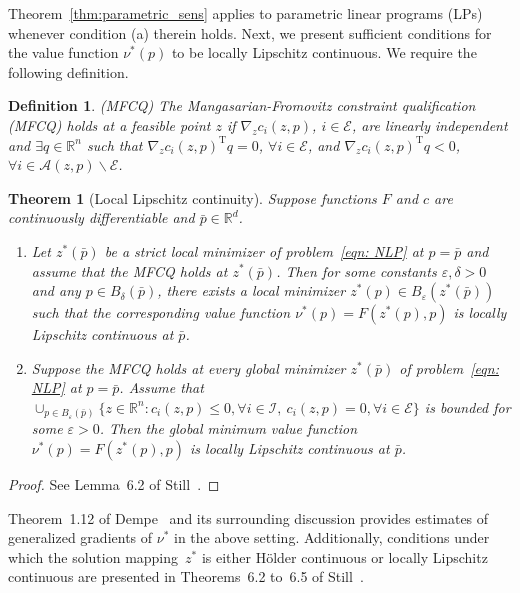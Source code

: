 \documentclass{article}
\newcommand{\tr}[1]{\ensuremath{{#1}^\text{T}}}
\newcommand{\A}{\mathcal{A}}
\newcommand{\E}{\mathcal{E}}
\newcommand{\I}{\mathcal{I}}
\newcommand{\R}{\mathbb{R}}
\newcommand{\1}[1]{\mathds{1}\left[#1\right]}
\newtheorem{theorem}{Theorem}[]
\newtheorem{definition}{Definition}
\begin{document}
Theorem~\ref{thm:parametric_sens} applies to parametric linear programs (LPs) whenever condition (a) therein holds.
Next, we present sufficient conditions for the value function $\nu^*(p)$ to be locally Lipschitz continuous.
We require the following definition.



\begin{definition}{(MFCQ)}
The Mangasarian-Fromovitz constraint qualification (MFCQ) holds at a feasible point $z$ if $\nabla_z c_i(z,p)$, $i \in \E$, are linearly independent and
$\exists q \in \R^n$ such that $\tr{\nabla_z c_i(z,p)} q = 0$, $\forall i \in \E$, and $\tr{\nabla_z c_i(z,p)} q < 0$, $\forall i \in \A(z,p) \backslash \E$.
\end{definition}


\begin{theorem}[Local Lipschitz continuity]
\label{thm:locally_lipschitz}
Suppose functions $F$ and $c$ are continuously differentiable and $\bar{p} \in \R^d$.
\begin{enumerate}[label=(\alph*)]
\item Let $z^*(\bar{p})$ be a strict local minimizer of problem~\eqref{eqn: NLP} at $p = \bar{p}$ and assume that the MFCQ holds at $z^*(\bar{p})$.
Then for some constants $\varepsilon, \delta > 0$ and any $p \in B_{\delta}(\bar{p})$, there exists a local minimizer $z^*(p) \in B_{\varepsilon}(z^*(\bar{p}))$ such that the corresponding value function $\nu^*(p) = F(z^*(p),p)$ is locally Lipschitz continuous at $\bar{p}$.

\item Suppose the MFCQ holds at every global minimizer $z^*(\bar{p})$ of problem~\eqref{eqn: NLP} at $p = \bar{p}$.
Assume that $\cup_{p \in B_{\varepsilon}(\bar{p})} \{z \in \R^n : c_i(z,p) \leq 0, \forall i \in \I, \: c_i(z,p) = 0, \forall i \in \E \}$ is bounded for some $\varepsilon > 0$.
Then the global minimum value function $\nu^*(p) = F(z^*(p),p)$ is locally Lipschitz continuous at $\bar{p}$.
\end{enumerate}
\end{theorem}
\begin{proof}
See Lemma~6.2 of Still~\cite{still2018lectures}.
\end{proof}

Theorem~1.12 of Dempe~\cite{dempe2017bilevel} and its surrounding discussion provides estimates of generalized gradients of $\nu^*$ in the above setting.
Additionally, conditions under which the solution mapping~$z^*$ is either H{\"o}lder continuous or locally Lipschitz continuous are presented in Theorems~6.2 to~6.5 of Still~\cite{still2018lectures}.
\end{document}
